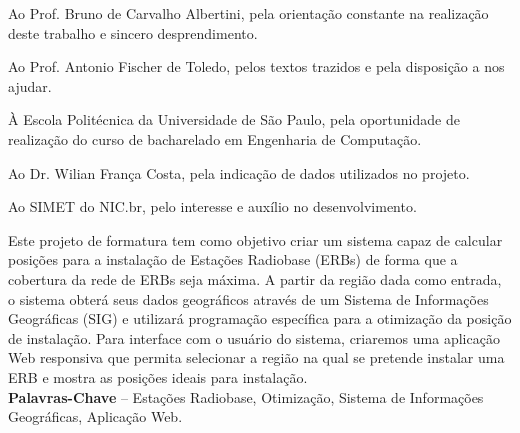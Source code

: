 \documentclass[]{politex}
\begin{document}
\capa
\falsafolhaderosto
\folhaderosto








\begin{agradecimentos}

Ao Prof. Bruno de Carvalho Albertini, pela orientação constante na realização
deste trabalho e sincero desprendimento.

Ao Prof. Antonio Fischer de Toledo, pelos textos trazidos e pela disposição a
nos ajudar.

À Escola Politécnica da Universidade de São Paulo, pela oportunidade de
realização do curso de bacharelado em Engenharia de Computação.

Ao Dr. Wilian França Costa, pela indicação de dados utilizados no projeto.

Ao SIMET do NIC.br, pelo interesse e auxílio no desenvolvimento.

\end{agradecimentos}




\begin{resumo}
Este projeto de formatura tem como objetivo criar um sistema capaz de calcular
posições para a instalação de Estações Radiobase (ERBs) de forma que a
cobertura da rede de ERBs seja máxima. A partir da região dada como entrada, o
sistema obterá seus dados geográficos através de um Sistema de Informações
Geográficas (SIG) e utilizará programação específica para a otimização da posição
de instalação. Para interface com o usuário do sistema, criaremos uma aplicação
Web responsiva que permita selecionar a região na qual se pretende instalar uma
ERB e mostra as posições ideais para instalação.
\\[3\baselineskip]
%
\textbf{Palavras-Chave} -- Estações Radiobase, Otimização, Sistema de
Informações Geográficas, Aplicação Web.
\end{resumo}
\end{document}

